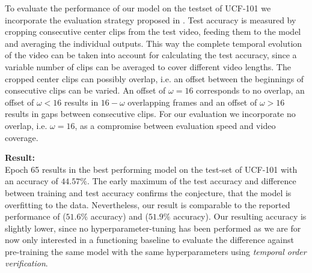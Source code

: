 To evaluate the performance of our model on the testset of UCF-101 we incorporate the evaluation strategy proposed in \cite{carreira_quo_2017}.
Test accuracy is measured by cropping consecutive center clips from the test video, feeding them to the model and averaging the individual outputs.
This way the complete temporal evolution of the video can be taken into account for calculating the test accuracy, since a variable number of clips can be averaged to cover different video lengths.
The cropped center clips can possibly overlap, i.e. an offset between the beginnings of consecutive clips can be varied.
An offset of $\omega = 16$ corresponds to no overlap, an offset of $\omega < 16$ results in $16 - \omega$ overlapping frames and an offset of $\omega > 16$ results in gaps between consecutive clips.
For our evaluation we incorporate no overlap, i.e. $\omega = 16$, as a compromise between evaluation speed and video coverage.

\textbf{Result:}\\
Epoch 65 results in the best performing model on the test-set of UCF-101 with an accuracy of $44.57\%$.
The early maximum of the test accuracy and difference between training and test accuracy confirms the conjecture, that the model is overfitting to the data.
Nevertheless, our result is comparable to the reported performance of \cite{carreira_quo_2017} ($51.6\%$ accuracy) and \cite{varol_long-term_2016} ($51.9\%$ accuracy).
Our resulting accuracy is slightly lower, since no hyperparameter-tuning has been performed as we are for now only interested in a functioning baseline to evaluate the difference against pre-training the same model with the same hyperparameters using \textit{temporal order verification}\cite{misra_shuffle_2016}.

